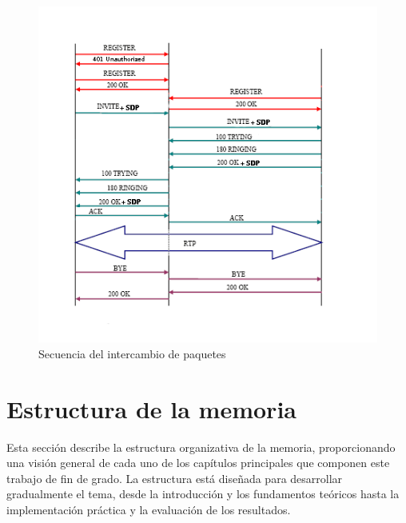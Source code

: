 \documentclass[a4paper, 12pt]{book}
\begin{document}
\begin{figure}
  \centering
  \includegraphics[width=15cm, keepaspectratio]{img/resultados/Secuencia_Paquetes.png}
  \caption{Secuencia del intercambio de paquetes}
  \label{fig:Secuencia_Paquetes_intro}
\end{figure}

\section{Estructura de la memoria}
\label{sec:estructura}
Esta sección describe la estructura organizativa de la memoria, proporcionando una visión 
general de cada uno de los capítulos principales que componen este trabajo de fin de grado. 
La estructura está diseñada para desarrollar gradualmente el tema, desde la introducción y 
los fundamentos teóricos hasta la implementación práctica y la evaluación de los resultados.
\end{document}
